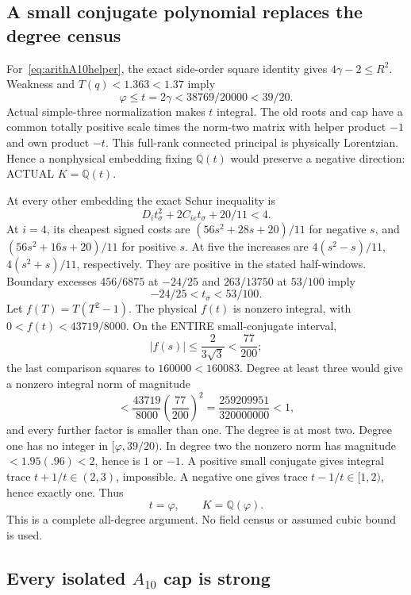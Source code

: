 \documentclass[11pt]{article}
\begin{document}
\subsection{A small conjugate polynomial replaces the degree census}
\label{app:arithA10helperfield}

For~\eqref{eq:arithA10helper}, the exact
side-order square identity gives
\(4\gamma-2\le R^2\).
Weakness and \(T(q)<1.363<1.37\) imply
\[
             \varphi\le t=2\gamma
                     <38769/20000<39/20 .
\]
Actual simple-three normalization makes
\(t\) integral.
The old roots and cap have a common
totally positive scale times the norm-two
matrix with helper product \(-1\) and
own product \(-t\).
This full-rank connected principal is
physically Lorentzian.
Hence a nonphysical embedding fixing
\(\mathbb Q(t)\) would preserve a negative
direction: ACTUAL \(K=\mathbb Q(t)\).

At every other embedding the exact Schur
inequality is
\[
                  D_i t_\sigma^2+2C_{ie}t_\sigma+20/11<4 .
\]
At \(i=4\), its cheapest signed costs are
\((56s^2+28s+20)/11\) for negative \(s\),
and \((56s^2+16s+20)/11\) for positive \(s\).
At five the increases are
\(4(s^2-s)/11\), \(4(s^2+s)/11\), respectively.
They are positive in the stated half-windows.
Boundary excesses \(456/6875\) at \(-24/25\)
and \(263/13750\) at \(53/100\) imply
\[
                   -24/25<t_\sigma<53/100 .
\]
Let \(f(T)=T(T^2-1)\).
The physical \(f(t)\) is nonzero integral,
with \(0<f(t)<43719/8000\).
On the ENTIRE small-conjugate interval,
\[
 |f(s)|\le {\frac{2}{3\sqrt3}}<{\frac{77}{200}};
\]
the last comparison squares to
\(160000<160083\).
Degree at least three would give a nonzero
integral norm of magnitude
\[
 <{\frac{43719}{8000}}\left({\frac{77}{200}}\right)^2
 ={\frac{259209951}{320000000}}<1 ,
\]
and every further factor is smaller than one.
The degree is at most two.
Degree one has no integer in
\([\varphi,39/20)\).
In degree two the nonzero norm has magnitude
\(<1.95(.96)<2\), hence is \(1\) or \(-1\).
A positive small conjugate gives integral
trace \(t+1/t\in(2,3)\), impossible.
A negative one gives trace
\(t-1/t\in[1,2)\), hence exactly one.
Thus
\[
                 t=\varphi,\qquad K=\mathbb Q(\varphi).
\tag{A10gold}\label{eq:arithA10gold}
\]
This is a complete all-degree argument.
No field census or assumed cubic bound is used.

\subsection[Every isolated A10 cap is strong]{Every isolated \(A_{10}\) cap is strong}
\label{app:arithA10isolated}
\end{document}

